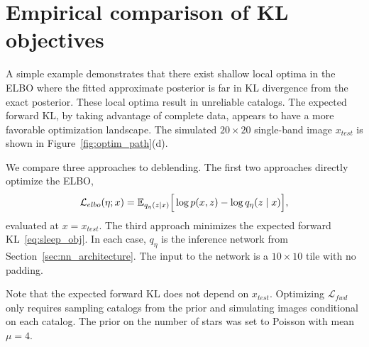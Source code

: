 \section{Empirical comparison of KL objectives}


\label{sec:elbo_sleep_compare}

A simple example demonstrates that there exist shallow local optima in the ELBO
where the fitted approximate posterior is far in KL divergence from the exact posterior.
These local optima result in unreliable catalogs.
The expected forward KL, by taking advantage of complete data, appears to have a more favorable optimization landscape.
The simulated $20\times20$ single-band image $x_{test}$ is shown in Figure~\ref{fig:optim_path}(d).

We compare three approaches to deblending. The first two approaches directly optimize the ELBO,
\begin{align}
\mathcal{L}_{elbo}(\eta; x) = \mathbb{E}_{q_{\eta}(z \mid x)}\Big[\log p(x, z) - \log q_{\eta}(z \mid x)\Big],
\label{eq:elbo_on_test}
\end{align}
evaluated at $x = x_{test}$. 
The third approach minimizes the expected forward KL~\eqref{eq:sleep_obj}.
In each case, $q_\eta$ is the inference network from Section~\ref{sec:nn_architecture}.
The input to the network is a $10\times 10$ tile with no padding.

Note that the expected forward KL does not depend on $x_{test}$.
Optimizing $\mathcal{L}_{fwd}$ only requires sampling catalogs from the prior
and simulating images conditional on each catalog.
The prior on the number of stars was set to Poisson with mean $\mu = 4$.

